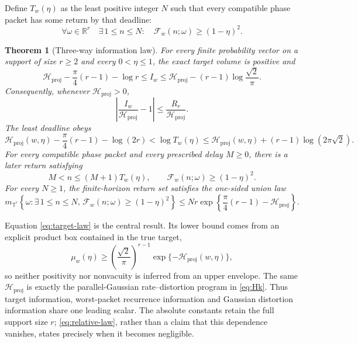 \documentclass[10pt]{article}
\newtheorem{theorem}{Theorem}
\theoremstyle{definition}
\newcommand{\R}{\mathbb R}
\newcommand{\T}{\mathbb T}
\newcommand{\proj}{\mathrm{proj}}
\newcommand{\Fid}{\mathcal F}
\newcommand{\Hwater}{\mathcal H}
\begin{document}
Define \(T_w(\eta)\) as the least positive integer \(N\) such that every
compatible phase packet has some return by that deadline:
\begin{equation}
 \forall\omega\in\R^r\quad \exists\,1\leq n\leq N:
 \quad \Fid_w(n;\omega)\geq(1-\eta)^2.
 \label{eq:minimax-time}
\end{equation}

\begin{theorem}[Three-way information law]
\label{thm:water}
For every finite probability vector on a support of size \(r\geq2\) and every
\(0<\eta\leq1\), the exact target volume is positive and
\begin{equation}
\boxed{
 \Hwater_{\proj}-\frac{\pi}{4}(r-1)-\log r
 \leq I_w
 \leq \Hwater_{\proj}-(r-1)\log\frac{\sqrt2}{\pi}.}
\label{eq:target-law}
\end{equation}
Consequently, whenever \(\Hwater_{\proj}>0\),
\begin{equation}
 \left|\frac{I_w}{\Hwater_{\proj}}-1\right|
 \leq\frac{R_r}{\Hwater_{\proj}}.
\label{eq:relative-law}
\end{equation}
The least deadline obeys
\begin{equation}
 \Hwater_{\proj}(w,\eta)-\frac{\pi}{4}(r-1)-\log(2r)
 <\log T_w(\eta)
 \leq
 \Hwater_{\proj}(w,\eta)+(r-1)\log(2\pi\sqrt2).
\label{eq:waterlaw}
\end{equation}
For every compatible phase packet and every prescribed delay \(M\geq0\),
there is a later return satisfying
\begin{equation}
 M<n\leq(M+1)T_w(\eta),\qquad
 \Fid_w(n;\omega)\geq(1-\eta)^2.
\label{eq:post-delay}
\end{equation}
For every \(N\geq1\), the finite-horizon return set satisfies the one-sided
union law
\begin{equation}
 m_{\T^r}\!\left\{\omega:\exists\,1\leq n\leq N,\,
   \Fid_w(n;\omega)\geq(1-\eta)^2\right\}
 \leq N r\exp\!\left\{\frac{\pi}{4}(r-1)
 -\Hwater_{\proj}\right\}.
\label{eq:quantile-law}
\end{equation}
\end{theorem}

Equation \eqref{eq:target-law} is the central result.  Its lower bound comes
from an explicit product box contained in the true target,
\[
 \mu_w(\eta)\geq
 \left(\frac{\sqrt2}{\pi}\right)^{r-1}
 \exp\{-\Hwater_{\proj}(w,\eta)\},
\]
so neither positivity nor nonvacuity is inferred from an upper envelope.
The same \(\Hwater_{\proj}\) is exactly the parallel-Gaussian
rate--distortion program in \eqref{eq:Hk}.  Thus target information,
worst-packet recurrence information and Gaussian distortion information
share one leading scalar.  The absolute constants retain the full support
size \(r\); \eqref{eq:relative-law}, rather than a claim that this dependence
vanishes, states precisely when it becomes negligible.
\end{document}
